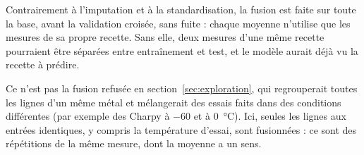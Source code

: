 Contrairement à l'imputation et à la standardisation, la fusion est faite sur toute la
base, avant la validation croisée, sans fuite : chaque moyenne n'utilise que les mesures
de sa propre recette. Sans elle, deux mesures d'une même recette pourraient être séparées
entre entraînement et test, et le modèle aurait déjà vu la recette à prédire.

Ce n'est pas la fusion refusée en section~\ref{sec:exploration}, qui regrouperait toutes
les lignes d'un même métal et mélangerait des essais faits dans des conditions
différentes (par exemple des Charpy à $-60$ et à \SI{0}{\celsius}). Ici, seules les
lignes aux entrées identiques, y compris la température d'essai, sont fusionnées : ce
sont des répétitions de la même mesure, dont la moyenne a un sens.


